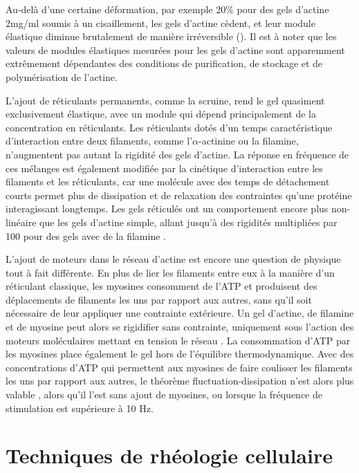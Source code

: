 Au-delà d'une certaine déformation, par exemple 20\% pour des gels d'actine 2mg/ml soumis à un cisaillement, les gels d'actine cèdent, et leur module élastique diminue brutalement de manière irréversible (\cite{janmey_mechanical_1994}).
Il est à noter que les valeurs de modules élastiques mesurées pour les gels d'actine sont apparemment extrêmement dépendantes des conditions de purification, de stockage et de polymérisation de l'actine. 

L'ajout de réticulants permanents, comme la scruine, rend le gel quasiment exclusivement élastique, avec un module qui dépend principalement de la concentration en réticulants. 
Les réticulants dotés d'un temps caractéristique d'interaction entre deux filaments, comme l'$\alpha$-actinine ou la filamine, n'augmentent pas autant la rigidité des gels d'actine. 
La réponse en fréquence de ces mélanges est également modifiée par la cinétique d'interaction entre les filaments et les réticulants, car une molécule avec des temps de détachement courts permet plus de dissipation et de relaxation des contraintes qu'une protéine interagissant longtemps. 
Les gels réticulés ont un comportement encore plus non-linéaire que les gels d'actine simple, allant jusqu'à des rigidités multipliées par 100 pour des gels avec de la filamine \parencite{gardel_stress-dependent_2006}. 

L'ajout de moteurs dans le réseau d'actine est encore une question de physique tout à fait différente. En plus de lier les filaments entre eux à la manière d'un réticulant classique, les myosines consomment de l'ATP et produisent des déplacements de filaments les uns par rapport aux autres, sans qu'il soit nécessaire de leur appliquer une contrainte extérieure. 
Un gel d'actine, de filamine et de myosine peut alors se rigidifier sans contrainte, uniquement sous l'action des moteurs moléculaires mettant en tension le réseau \parencite{koenderink_active_2009}. 
La consommation d'ATP par les myosines place également le gel hors de l'équilibre thermodynamique. 
Avec des concentrations d'ATP qui permettent aux myosines de faire coulisser les filaments les uns par rapport aux autres, le théorème fluctuation-dissipation n'est alors plus valable \parencite{mizuno_nonequilibrium_2007}, alors qu'il l'est sans ajout de myosines, ou lorsque la fréquence de stimulation est supérieure à 10 Hz. 



\section{Techniques de rhéologie cellulaire}

